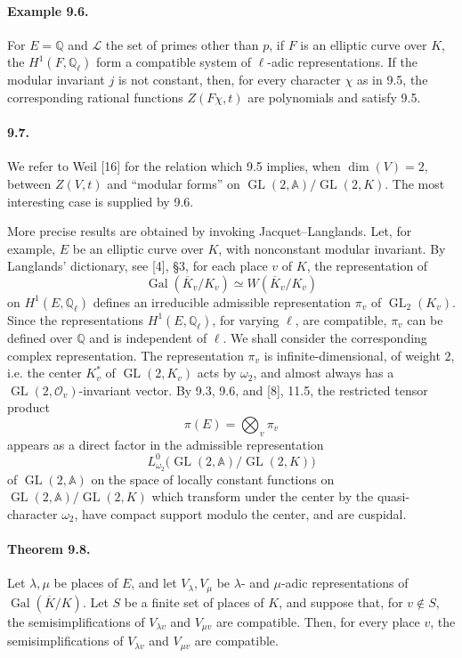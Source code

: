 \documentclass[10pt]{article}
\newcommand{\Q}{\mathbb Q}
\newcommand{\Gal}{\operatorname{Gal}}
\newcommand{\GL}{\operatorname{GL}}
\providecommand{\Gal}{\operatorname{Gal}}
\providecommand{\GL}{\operatorname{GL}}
\providecommand{\LLL}{\mathcal L}
\providecommand{\Gal}{\operatorname{Gal}}
\providecommand{\GL}{\operatorname{GL}}
\providecommand{\Gal}{\operatorname{Gal}}
\providecommand{\Gal}{\operatorname{Gal}}
\begin{document}
\paragraph{Example 9.6.} For $E=\Q$ and $\LLL$ the set of primes other than $p$, if $F$ is an elliptic curve over $K$, the $H^1(F,\Q_\ell)$ form a compatible system of $\ell$-adic representations. If the modular invariant $j$ is not constant, then, for every character $\chi$ as in 9.5, the corresponding rational functions $Z(F\chi,t)$ are polynomials and satisfy 9.5.

\paragraph{9.7.} We refer to Weil [16] for the relation which 9.5 implies, when $\dim(V)=2$, between $Z(V,t)$ and “modular forms” on $\GL(2,\mathbb A)/\GL(2,K)$. The most interesting case is supplied by 9.6.

More precise results are obtained by invoking Jacquet--Langlands. Let, for example, $E$ be an elliptic curve over $K$, with nonconstant modular invariant. By Langlands' dictionary, see [4], §3, for each place $v$ of $K$, the representation of
\[
\Gal(\overline K_v/K_v)\simeq W(\overline K_v/K_v)
\]
on $H^1(E,\Q_\ell)$ defines an irreducible admissible representation $\pi_v$ of $\GL_2(K_v)$. Since the representations $H^1(E,\Q_\ell)$, for varying $\ell$, are compatible, $\pi_v$ can be defined over $\Q$ and is independent of $\ell$. We shall consider the corresponding complex representation. The representation $\pi_v$ is infinite-dimensional, of weight $2$, i.e. the center $K_v^*$ of $\GL(2,K_v)$ acts by $\omega_2$, and almost always has a $\GL(2,\mathcal O_v)$-invariant vector. By 9.3, 9.6, and [8], 11.5, the restricted tensor product
\[
\pi(E)=\bigotimes_v \pi_v
\]
appears as a direct factor in the admissible representation
\[
L^0_{\omega_2}\bigl(\GL(2,\mathbb A)/\GL(2,K)\bigr)
\]
of $\GL(2,\mathbb A)$ on the space of locally constant functions on $\GL(2,\mathbb A)/\GL(2,K)$ which transform under the center by the quasi-character $\omega_2$, have compact support modulo the center, and are cuspidal.

\paragraph{Theorem 9.8.} Let $\lambda,\mu$ be places of $E$, and let $V_\lambda,V_\mu$ be $\lambda$- and $\mu$-adic representations of $\Gal(\overline K/K)$. Let $S$ be a finite set of places of $K$, and suppose that, for $v\notin S$, the semisimplifications of $V_{\lambda v}$ and $V_{\mu v}$ are compatible. Then, for every place $v$, the semisimplifications of $V_{\lambda v}$ and $V_{\mu v}$ are compatible.
\end{document}
